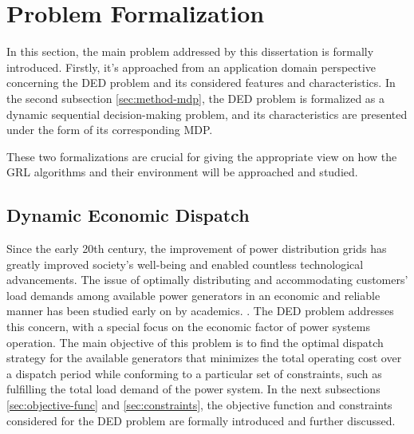 \section{Problem Formalization} \label{sec:method-formal}

In this section, the main problem addressed by this dissertation is formally introduced. Firstly, it's approached from an application domain perspective concerning the \ac{DED} problem and its considered features and characteristics. In the second subsection \ref{sec:method-mdp}, the \ac{DED} problem is formalized as a dynamic sequential decision-making problem, and its characteristics are presented under the form of its corresponding \ac{MDP}. \par
These two formalizations are crucial for giving the appropriate view on how the \ac{GRL} algorithms and their environment will be approached and studied.

\subsection{Dynamic Economic Dispatch} \label{sec:method-ded}

Since the early 20th century, the improvement of power distribution grids has greatly improved society's well-being and enabled countless technological advancements. The issue of optimally distributing and accommodating customers' load demands among available power generators in an economic and reliable manner has been studied early on by academics. \cite{xiaOptimalDynamicEconomic2010}. The \acf{DED} problem addresses this concern, with a special focus on the economic factor of power systems operation. The main objective of this problem is to find the optimal dispatch strategy for the available generators that minimizes the total operating cost over a dispatch period while conforming to a particular set of constraints, such as fulfilling the total load demand of the power system. In the next subsections \ref{sec:objective-func} and \ref{sec:constraints}, the objective function and constraints considered for the \ac{DED} problem are formally introduced and further discussed.

